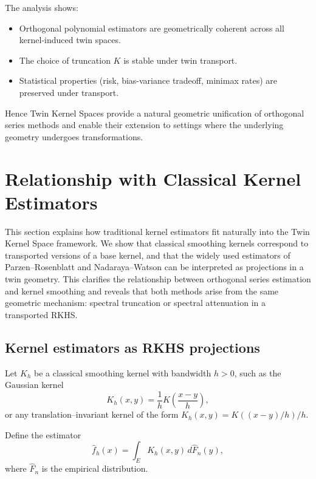 \documentclass[11pt,a4paper]{article}
\begin{document}
The analysis shows:
\begin{itemize}
\item Orthogonal polynomial estimators are geometrically coherent across all kernel-induced twin spaces.
\item The choice of truncation $K$ is stable under twin transport.
\item Statistical properties (risk, bias-variance tradeoff, minimax rates) are preserved under transport.
\end{itemize}

Hence Twin Kernel Spaces provide a natural geometric unification of orthogonal series methods and enable their extension to settings where the underlying geometry undergoes transformations.

\section{Relationship with Classical Kernel Estimators}\label{sec:kernel}

This section explains how traditional kernel estimators fit naturally into the Twin Kernel Space framework. We show that classical smoothing kernels correspond to transported versions of a base kernel, and that the widely used estimators of Parzen--Rosenblatt and Nadaraya--Watson can be interpreted as projections in a twin geometry. This clarifies the relationship between orthogonal series estimation and kernel smoothing and reveals that both methods arise from the same geometric mechanism: spectral truncation or spectral attenuation in a transported RKHS.

\subsection{Kernel estimators as RKHS projections}

Let $K_h$ be a classical smoothing kernel with bandwidth $h > 0$, such as the Gaussian kernel
\[
K_h(x, y) = \frac{1}{h} K\left(\frac{x - y}{h}\right),
\]
or any translation--invariant kernel of the form $K_h(x, y) = K((x-y)/h)/h$.

Define the estimator
\begin{equation}\label{eq:kernel_estimator}
\hat{f}_h(x) = \int_E K_h(x, y) \, d\hat{F}_n(y),
\end{equation}
where $\hat{F}_n$ is the empirical distribution.
\end{document}
